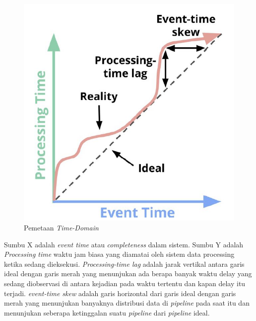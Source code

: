\documentclass[a4paper,twoside]{article}
\begin{document}
\begin{enumerate}
		\begin{figure}[H] 
		\centering  
		\includegraphics[scale=0.5]{1-processing-event-relationship}  
		\caption[Gambar Pemetaan {\it Time-Domain}]{Pemetaan {\it Time-Domain}} 
		\label{fig:processing-events relationship}
		\end{figure} 
		
		Sumbu X adalah \textit{event time} atau \textit{completeness} dalam sistem. Sumbu Y adalah 				\textit{Processing time} waktu jam biasa yang diamatai oleh sistem data processing ketika 				sedang dieksekusi. \textit{Processing-time lag} adalah jarak vertikal antara garis ideal 				dengan garis merah yang menunjukan ada berapa banyak waktu delay yang sedang diobservasi di 			antara kejadian pada waktu tertentu dan kapan delay itu terjadi. \textit{event-time skew} 				adalah garis horizontal dari garis ideal dengan garis merah yang menunjukan banyaknya 					distribusi data di \textit{pipeline} pada saat itu dan menunjukan seberapa ketinggalan suatu
		\textit{pipeline} dari \textit{pipeline} ideal.          


\end{enumerate}
\end{document}
